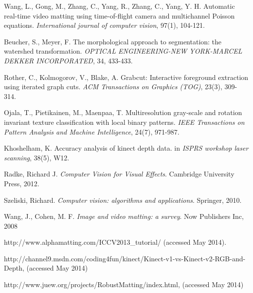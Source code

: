 \documentclass[a4paper,11pt]{report}
\begin{document}
\begin{thebibliography}{100}
 Wang, L., Gong, M., Zhang, C., Yang, R., Zhang, C., Yang, Y. H. Automatic real-time video matting using time-of-flight camera and multichannel Poisson equations. \textit{International journal of computer vision}, 97(1), 104-121.

 Beucher, S., Meyer, F. The morphological approach to segmentation: the watershed transformation. \textit{OPTICAL ENGINEERING-NEW YORK-MARCEL DEKKER INCORPORATED}, 34, 433-433.

 Rother, C., Kolmogorov, V., Blake, A. Grabcut: Interactive foreground extraction using iterated graph cuts. \textit{ACM Transactions on Graphics (TOG)}, 23(3),  309-314.

 Ojala, T., Pietikainen, M., Maenpaa, T. Multiresolution gray-scale and rotation invariant texture classification with local binary patterns. \textit{IEEE Transactions on Pattern Analysis and Machine Intelligence}, 24(7), 971-987.

 Khoshelham, K. Accuracy analysis of kinect depth data. in \textit{ISPRS workshop laser scanning}, 38(5), W12.

 Radke, Richard J. \textit{Computer Vision for Visual Effects}. Cambridge University Press, 2012.

 Szeliski, Richard. \textit{Computer vision: algorithms and applications}. Springer, 2010.

 Wang, J., Cohen, M. F. \textit{Image and video matting: a survey}. Now Publishers Inc, 2008

 http://www.alphamatting.com/ICCV2013\_tutorial/ (accessed May 2014).

 http://channel9.msdn.com/coding4fun/kinect/Kinect-v1-vs-Kinect-v2-RGB-and-Depth, (accessed May 2014)

 http://www.juew.org/projects/RobustMatting/index.html, (accessed May 2014)

\end{thebibliography}



\end{document}
